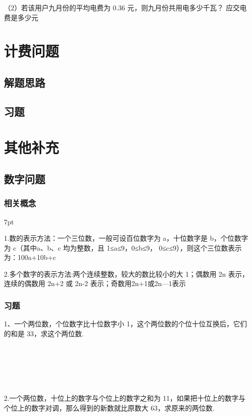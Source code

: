 \documentclass{article}
\newenvironment{wa}{%
\def\FrameCommand{%
\hspace{1pt}%
{\color{LightCoral}\vrule width 2pt}%
{\color{washade}\vrule width 4pt}%
\colorbox{washade}%
}%
\MakeFramed{\advance\hsize-\width\FrameRestore}%
\noindent\hspace{-4.55pt}%
\begin{adjustwidth}{}{7pt}%
\vspace{2pt}\vspace{2pt}%
\normalfont %
}
{%
\vspace{2pt}\end{adjustwidth}\endMakeFramed%
}
\begin{document}
（2）若该用户九月份的平均电费为 0.36 元，则九月份共用电多少千瓦？ 应交电费是多少元


\newpage
\section{计费问题}
\subsection{解题思路}
\subsection{习题}

\newpage
\section{其他补充}
\subsection{数字问题}
\subsubsection*{相关概念}
\begin{wa}

\quad \quad   1.数的表示方法：一个三位数，一般可设百位数字为 a，十位数字是 b，个位数字为 c（其中a、b、c 均为整数，且 1≤a≤9，0≤b≤9， 0≤c≤9），则这个三位数表示为：100a+10b+c

2.多个数字的表示方法:两个连续整数，较大的数比较小的大 1；偶数用 2n 表示，连续的偶数用 2n+2 或 2n-2 表示；奇数用2n+1或2n—1表示
\end{wa}

\subsubsection*{习题}
1、一个两位数，个位数字比十位数字小 1，这个两位数的个位十位互换后，它们的和是 33，求这个两位数.

~\\
~\\
~\\
~\\
~\\
2.一个两位数，十位上的数字与个位上的数字之和为 11，如果把十位上的数字与个位上的数字对调，那么得到的新数就比原数大 63，求原来的两位数.
\end{document}
